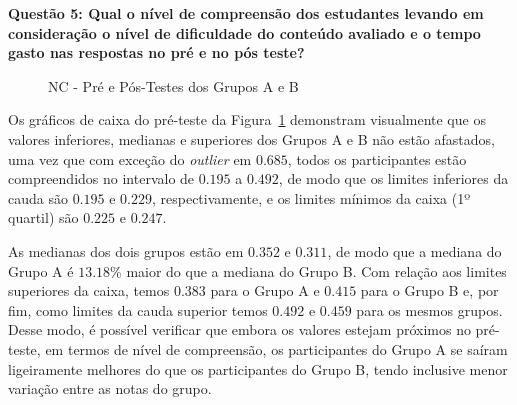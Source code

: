 \textbf{Questão 5: Qual o nível de compreensão dos estudantes levando em consideração o nível de dificuldade do conteúdo avaliado e o tempo gasto nas respostas no pré e no pós teste?}

\begin{figure}[htb]
	\centering
	\captionsetup{justification=centering}
	\caption{NC - Pré e Pós-Testes dos Grupos A e B}
	\label{fig:F1_NC_H02}
\end{figure}

Os gráficos de caixa do pré-teste da Figura~\ref{fig:F1_NC_H02} demonstram visualmente que os valores inferiores, medianas e superiores dos Grupos A e B não estão afastados, uma vez que com exceção do \textit{outlier} em $0.685$, todos os participantes estão compreendidos no intervalo de $0.195$ a $0.492$,  de modo que os limites inferiores da cauda são $0.195$ e $0.229$, respectivamente, e os limites mínimos da caixa (1º quartil) são $0.225$ e $0.247$.

As medianas dos dois grupos estão em $0.352$ e $0.311$, de modo que a mediana do Grupo A é $13.18\%$ maior do que a mediana do Grupo B. Com relação aos limites superiores da caixa, temos $0.383$ para o Grupo A e $0.415$ para o Grupo B e, por fim, como limites da cauda superior temos $0.492$ e $0.459$ para os mesmos grupos. Desse modo, é possível verificar que embora os valores estejam próximos no pré-teste, em termos de nível de compreensão, os participantes do Grupo A se saíram ligeiramente melhores do que os participantes do Grupo B, tendo inclusive menor variação entre as notas do grupo.

